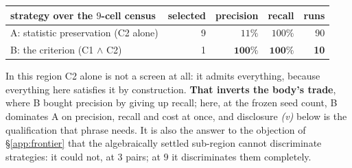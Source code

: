 \documentclass{article}
\begin{document}
\begin{center}\small\setlength{\tabcolsep}{6pt}
\begin{tabular}{@{}lrrrr@{}}
\toprule
strategy over the $9$-cell census & selected & precision & recall & runs \\
\midrule
A: statistic preservation (C2 alone) & 9 & $11\%$ & $100\%$ & 90 \\
B: the criterion (C1 $\wedge$ C2)    & 1 & $\mathbf{100\%}$ & $\mathbf{100\%}$ & \textbf{10} \\
\bottomrule
\end{tabular}
\end{center}

\noindent In this region C2 alone is not a screen at all: it admits everything, because everything
here satisfies it by construction. \textbf{That inverts the body's trade}, where B bought precision
by giving up recall; here, at the frozen seed count, B dominates A on precision, recall and cost at
once, and disclosure \emph{(v)} below is the qualification that phrase needs. It is also the
answer to the objection of §\ref{app:frontier} that the algebraically settled sub-region cannot
discriminate strategies: it could not, at $3$ pairs; at $9$ it discriminates them completely.
\end{document}
